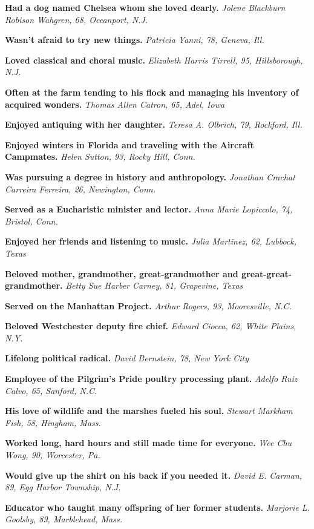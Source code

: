 \textbf{Had a dog named Chelsea whom she loved dearly.} \emph{Jolene
Blackburn Robison Wahgren, 68, Oceanport, N.J.}

\textbf{Wasn't afraid to try new things.} \emph{Patricia Yanni, 78,
Geneva, Ill.}

\textbf{Loved classical and choral music.} \emph{Elizabeth Harris
Tirrell, 95, Hillsborough, N.J.}

\textbf{Often at the farm tending to his flock and managing his
inventory of acquired wonders.} \emph{Thomas Allen Catron, 65, Adel,
Iowa}

\textbf{Enjoyed antiquing with her daughter.} \emph{Teresa A. Olbrich,
79, Rockford, Ill.}

\textbf{Enjoyed winters in Florida and traveling with the Aircraft
Campmates.} \emph{Helen Sutton, 93, Rocky Hill, Conn.}

\textbf{Was pursuing a degree in history and anthropology.}
\emph{Jonathan Crachat Carreira Ferreira, 26, Newington, Conn.}

\textbf{Served as a Eucharistic minister and lector.} \emph{Anna Marie
Lopiccolo, 74, Bristol, Conn.}

\textbf{Enjoyed her friends and listening to music.} \emph{Julia
Martinez, 62, Lubbock, Texas}

\textbf{Beloved mother, grandmother, great-grandmother and
great-great-grandmother.} \emph{Betty Sue Harber Carney, 81, Grapevine,
Texas}

\textbf{Served on the Manhattan Project.} \emph{Arthur Rogers, 93,
Mooresville, N.C.}

\textbf{Beloved Westchester deputy fire chief.} \emph{Edward Ciocca, 62,
White Plains, N.Y.}

\textbf{Lifelong political radical.} \emph{David Bernstein, 78, New York
City}

\textbf{Employee of the Pilgrim's Pride poultry processing plant.}
\emph{Adelfo Ruiz Calvo, 65, Sanford, N.C.}

\textbf{His love of wildlife and the marshes fueled his soul.}
\emph{Stewart Markham Fish, 58, Hingham, Mass.}

\textbf{Worked long, hard hours and still made time for everyone.}
\emph{Wee Chu Wong, 90, Worcester, Pa.}

\textbf{Would give up the shirt on his back if you needed it.}
\emph{David E. Carman, 89, Egg Harbor Township, N.J.}

\textbf{Educator who taught many offspring of her former students.}
\emph{Marjorie L. Goolsby, 89, Marblehead, Mass.}

